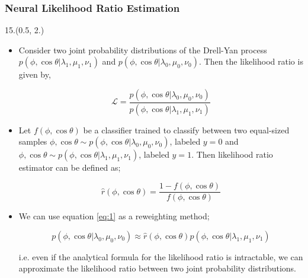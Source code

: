 \documentclass[10pt, xcolor={dvipsnames}, sans, mathserif, aspectratio=169]{beamer}
\newenvironment{List}[2]
{\begin{textblock}{#1}#2
\begin{itemize}}
{\end{itemize}
\end{textblock}}
\newcommand{\citeslide}[1]{{\tiny \footfullcite{#1}}}
\begin{document}
\begin{frame}
\frametitle{Neural Likelihood Ratio Estimation}

\begin{List}{15.}{(0.5, 2.)}
	
	\item Consider two joint probability distributions of the Drell-Yan process $p(\phi, \cos\theta | \lambda_{1}, \mu_{1}, \nu_{1})$ and $p(\phi, \cos\theta | \lambda_{0}, \mu_{0}, \nu_{0})$. Then the likelihood ratio is given by,
	
	\begin{equation*}
		\mathcal{L} = \dfrac{p(\phi, \cos\theta | \lambda_{0}, \mu_{0}, \nu_{0})}{p(\phi, \cos\theta | \lambda_{1}, \mu_{1}, \nu_{1})}
	\end{equation*}
	
	\item Let $f(\phi, \cos\theta)$ be a classifier trained to classify between two equal-sized samples ${\phi, \cos\theta} \sim p(\phi, \cos\theta | \lambda_{0}, \mu_{0}, \nu_{0})$, labeled $y = 0$ and ${\phi, \cos\theta} \sim p(\phi, \cos\theta | \lambda_{1}, \mu_{1}, \nu_{1})$, labeled $y = 1$. Then likelihood ratio estimator can be defined as;
	
	\begin{equation}
		\hat{r}(\phi, \cos\theta) = \dfrac{1 - f(\phi, \cos\theta)}{f(\phi, \cos\theta)}
		\label{eq:1}
	\end{equation}
	
	\item We can use equation \ref{eq:1} as a reweighting method;
	
	\begin{equation*}
		p(\phi, \cos\theta | \lambda_{0}, \mu_{0}, \nu_{0}) \approx \hat{r}(\phi, \cos\theta) p(\phi, \cos\theta | \lambda_{1}, \mu_{1}, \nu_{1})
	\end{equation*}
	
	i.e. even if the analytical formula for the likelihood ratio is intractable, we can approximate the likelihood ratio between two joint probability distributions.\citeslide{Brehmer:2018eca}
	
\end{List}
\end{frame}
\end{document}
